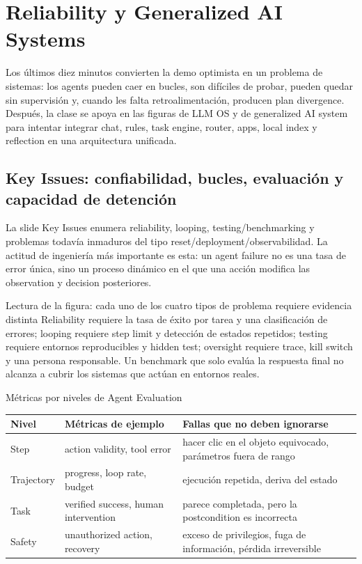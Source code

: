 \section{Reliability y Generalized AI Systems}

Los últimos diez minutos convierten la demo optimista en un problema de sistemas: los agents pueden caer en bucles, son difíciles de probar, pueden quedar sin supervisión y, cuando les falta retroalimentación, producen plan divergence. Después, la clase se apoya en las figuras de LLM OS y de generalized AI system para intentar integrar chat, rules, task engine, router, apps, local index y reflection en una arquitectura unificada.

\subsection{Key Issues: confiabilidad, bucles, evaluación y capacidad de detención}

La slide Key Issues enumera reliability, looping, testing/benchmarking y problemas todavía inmaduros del tipo reset/deployment/observabilidad. La actitud de ingeniería más importante es esta: un agent failure no es una tasa de error única, sino un proceso dinámico en el que una acción modifica las observation y decision posteriores.


\begin{knowledgebox}{Lectura de la figura: cada uno de los cuatro tipos de problema requiere evidencia distinta}
Reliability requiere la tasa de éxito por tarea y una clasificación de errores; looping requiere step limit y detección de estados repetidos; testing requiere entornos reproducibles y hidden test; oversight requiere trace, kill switch y una persona responsable. Un benchmark que solo evalúa la respuesta final no alcanza a cubrir los sistemas que actúan en entornos reales.
\end{knowledgebox}

\begin{importantbox}{Métricas por niveles de Agent Evaluation}
\begin{tabularx}{\textwidth}{L{0.22\textwidth}X X}
\toprule
Nivel & Métricas de ejemplo & Fallas que no deben ignorarse \\
\midrule
Step & action validity, tool error & hacer clic en el objeto equivocado, parámetros fuera de rango \\
Trajectory & progress, loop rate, budget & ejecución repetida, deriva del estado \\
Task & verified success, human intervention & parece completada, pero la postcondition es incorrecta \\
Safety & unauthorized action, recovery & exceso de privilegios, fuga de información, pérdida irreversible \\
\bottomrule
\end{tabularx}
\end{importantbox}

